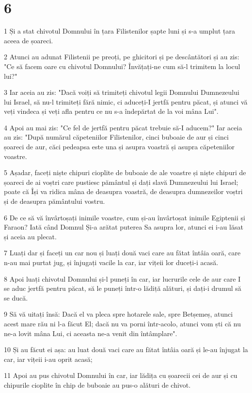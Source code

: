 \chapter{6}

\par 1 Și a stat chivotul Domnului în țara Filistenilor șapte luni și s-a umplut țara aceea de șoareci.
\par 2 Atunci au adunat Filistenii pe preoți, pe ghicitori și pe descântători și au zis: "Ce să facem oare cu chivotul Domnului? Învățați-ne cum să-l trimitem la locul lui?"
\par 3 Iar aceia au zis: "Dacă voiți să trimiteți chivotul legii Domnului Dumnezeului lui Israel, să nu-l trimiteți fără nimic, ci aduceți-I jertfă pentru păcat, și atunci vă veți vindeca și veți afla pentru ce nu s-a îndepărtat de la voi mâna Lui".
\par 4 Apoi au mai zis: "Ce fel de jertfă pentru păcat trebuie să-I aducem?" Iar aceia au zis: "După numărul căpeteniilor Filistenilor, cinci buboaie de aur și cinci șoareci de aur, căci pedeapsa este una și asupra voastră și asupra căpeteniilor voastre.
\par 5 Așadar, faceți niște chipuri cioplite de buboaie de ale voastre și niște chipuri de șoareci de ai voștri care pustiesc pământul și dați slavă Dumnezeului lui Israel; poate că Își va ridica mâna de deasupra voastră, de deasupra dumnezeilor voștri și de deasupra pământului vostru.
\par 6 De ce să vă învârtoșați inimile voastre, cum și-au învârtoșat inimile Egiptenii și Faraon? Iată când Domnul Și-a arătat puterea Sa asupra lor, atunci ei i-au lăsat și aceia au plecat.
\par 7 Luați dar și faceți un car nou și luați două vaci care au fătat întâia oară, care n-au mai purtat jug, și înjugați vacile la car, iar vițeii lor duceți-i acasă.
\par 8 Apoi luați chivotul Domnului și-l puneți în car, iar lucrurile cele de aur care I se aduc jertfă pentru păcat, să le puneți într-o lădiță alături, și dați-i drumul să se ducă.
\par 9 Să vă uitați însă: Dacă el va pleca spre hotarele sale, spre Betșemeș, atunci acest mare rău ni l-a făcut El; dacă nu va porni într-acolo, atunci vom ști că nu ne-a lovit mâna Lui, ci aceasta ne-a venit din întâmplare".
\par 10 Și au făcut ei așa: au luat două vaci care au fătat întâia oară și le-au înjugat la car, iar vițeii i-au oprit acasă;
\par 11 Apoi au pus chivotul Domnului în car, iar lădița cu șoarecii cei de aur și cu chipurile cioplite în chip de buboaie au pus-o alături de chivot.
